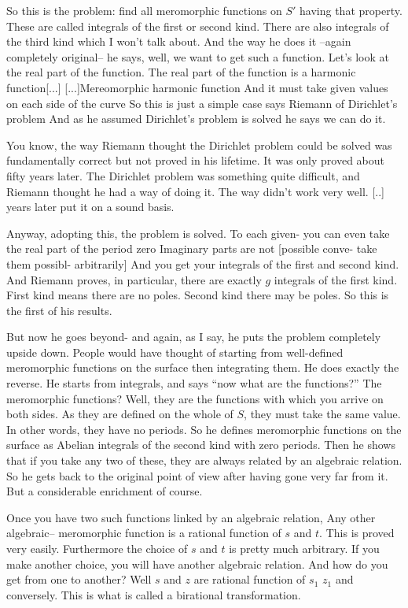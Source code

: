 \documentclass{article}
\begin{document}
So this is the problem:
find all meromorphic functions on $S'$ 
having that property. 
These are called integrals of the first or second kind.
There are also integrals of the third kind 
which I won't talk about.
And the way he does it --again completely original--
he says, well, we want to get such a function.
Let's look at the real part of the function.
The real part of the function is a harmonic function[...]
[...]Mereomorphic harmonic function
And it must take given values on each side of the curve
So this is just a simple case says Riemann of Dirichlet's problem
And as he assumed Dirichlet's problem is solved he says we can do it.

You know, the way Riemann thought the Dirichlet problem could be solved 
was fundamentally correct but not proved in his lifetime.
It was only proved about fifty years later.
The Dirichlet problem was something quite difficult,
and Riemann thought he had a way of doing it.
The way didn't work very well.
[..] years later put it on a sound basis.

Anyway, adopting this, the problem is solved.
To each given- you can even take the real part of the period zero
Imaginary parts are not [possible conve- take them possibl- arbitrarily]
And you get your integrals of the first and second kind.
And Riemann proves, in particular,
there are exactly $g$ integrals of the first kind.
First kind means there are no poles.
Second kind there may be poles.
So this is the first of his results.

But now he goes beyond-
and again, as I say, 
he puts the problem completely upside down.
People would have thought of starting 
from well-defined meromorphic functions 
on the surface then integrating them.
He does exactly the reverse.
He starts from integrals,
and says ``now what are the functions?'' 
The meromorphic functions?
Well, they are the functions with which 
you arrive on both sides.
As they are defined on the whole of $S$,
they must take the same value.
In other words, they have no periods.
So he defines meromorphic functions 
on the surface as Abelian integrals 
of the second kind with zero periods.
Then he shows that if you take any two of these,
they are always related by an algebraic relation.
So he gets back to the original point of view
after having gone very far from it.
But a considerable enrichment of course.

Once you have two such functions 
linked by an algebraic relation,
Any other algebraic-- meromorphic function 
is a rational function of $s$ and $t$.
This is proved very easily.
Furthermore the choice of $s$ and $t$ is pretty much arbitrary.
If you make another choice, 
you will have another algebraic relation.
And how do you get from one to another?
Well $s$ and $z$ are rational function of $s_1$ $z_1$ and conversely.
This is what is called a birational transformation.
\end{document}
